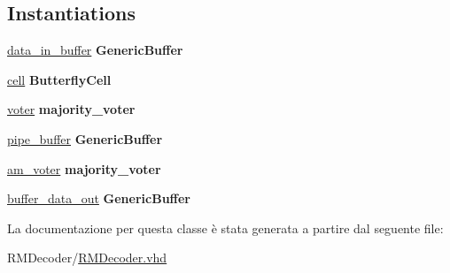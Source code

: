 \subsection*{Instantiations}
 \begin{DoxyCompactItemize}
\item 
\hypertarget{class_r_m_decoder_1_1_structural_ac69adf2a26119ed9eb872ec1b20331e6}{\hyperlink{class_r_m_decoder_1_1_structural_ac69adf2a26119ed9eb872ec1b20331e6}{data\+\_\+in\+\_\+buffer}  {\bfseries Generic\+Buffer}   }\label{class_r_m_decoder_1_1_structural_ac69adf2a26119ed9eb872ec1b20331e6}

\item 
\hypertarget{class_r_m_decoder_1_1_structural_ab314bda3028efc7ff5f435a6c94dd91d}{\hyperlink{class_r_m_decoder_1_1_structural_ab314bda3028efc7ff5f435a6c94dd91d}{cell}  {\bfseries Butterfly\+Cell}   }\label{class_r_m_decoder_1_1_structural_ab314bda3028efc7ff5f435a6c94dd91d}

\item 
\hypertarget{class_r_m_decoder_1_1_structural_a8934cb3adca848b0bfac3a3ece8ae0d9}{\hyperlink{class_r_m_decoder_1_1_structural_a8934cb3adca848b0bfac3a3ece8ae0d9}{voter}  {\bfseries majority\+\_\+voter}   }\label{class_r_m_decoder_1_1_structural_a8934cb3adca848b0bfac3a3ece8ae0d9}

\item 
\hypertarget{class_r_m_decoder_1_1_structural_adf0678d4953108f0df60d34cfedf977d}{\hyperlink{class_r_m_decoder_1_1_structural_adf0678d4953108f0df60d34cfedf977d}{pipe\+\_\+buffer}  {\bfseries Generic\+Buffer}   }\label{class_r_m_decoder_1_1_structural_adf0678d4953108f0df60d34cfedf977d}

\item 
\hypertarget{class_r_m_decoder_1_1_structural_a0310e0cbca6fa2f66210c8a9cc7756f3}{\hyperlink{class_r_m_decoder_1_1_structural_a0310e0cbca6fa2f66210c8a9cc7756f3}{am\+\_\+voter}  {\bfseries majority\+\_\+voter}   }\label{class_r_m_decoder_1_1_structural_a0310e0cbca6fa2f66210c8a9cc7756f3}

\item 
\hypertarget{class_r_m_decoder_1_1_structural_a9969ede58861b2f719256f807704253c}{\hyperlink{class_r_m_decoder_1_1_structural_a9969ede58861b2f719256f807704253c}{buffer\+\_\+data\+\_\+out}  {\bfseries Generic\+Buffer}   }\label{class_r_m_decoder_1_1_structural_a9969ede58861b2f719256f807704253c}

\end{DoxyCompactItemize}


La documentazione per questa classe è stata generata a partire dal seguente file\+:\begin{DoxyCompactItemize}
\item 
R\+M\+Decoder/\hyperlink{_r_m_decoder_8vhd}{R\+M\+Decoder.\+vhd}\end{DoxyCompactItemize}
